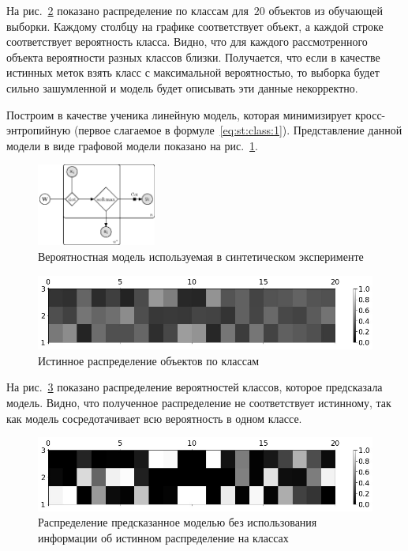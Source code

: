 На рис.~\ref{fg:ex:synt:distr:real} показано распределение по классам для~$20$ объектов из обучающей выборки. Каждому столбцу на графике соответствует объект, а каждой строке соответствует вероятность класса. Видно, что для каждого рассмотренного объекта вероятности разных классов близки. Получается, что если в качестве истинных меток взять класс с максимальной вероятностью, то выборка будет сильно зашумленной и модель будет описывать эти данные некорректно.

Построим в качестве ученика линейную модель, которая минимизирует кросс-энтропийную (первое слагаемое в формуле~\eqref{eq:st:class:1}). Представление данной модели в виде графовой модели показано на рис.~\ref{fg:ex:synt:plate}.

\begin{figure}[!ht]\center
\includegraphics[width=0.35\textwidth]{results/privlearn/linear_model}
\caption{Вероятностная модель используемая в синтетическом эксперименте}
\label{fg:ex:synt:plate}
\end{figure}

\begin{figure}[!ht]\center
\includegraphics[width=1\textwidth]{results/privlearn/syn_real_distr}
\caption{Истинное распределение  объектов по классам}
\label{fg:ex:synt:distr:real}
\end{figure}


На рис.~\ref{fg:ex:synt:distr:without} показано распределение вероятностей классов, которое предсказала модель. Видно, что полученное распределение не соответствует истинному, так как модель сосредотачивает всю вероятность в одном классе.

\begin{figure}[!ht]\center
\includegraphics[width=1\textwidth]{results/privlearn/syn_without_teacher_distr}
\caption{Распределение предсказанное моделью без использования информации об истинном распределение на классах}
\label{fg:ex:synt:distr:without}
\end{figure}

